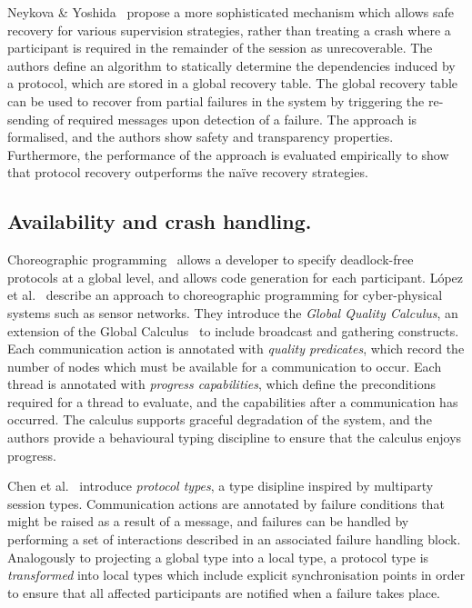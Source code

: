 \documentclass[
graybox,
envcountchap
]{svmult}
\begin{document}
\begin{bibunit}
  Neykova \& Yoshida~\cite{NeykovaY17:let-it-recover} propose a more
  sophisticated mechanism which allows safe recovery for various supervision
  strategies, rather than treating a crash where a participant is required in
  the remainder of the session as unrecoverable. The authors define an algorithm
  to statically determine the dependencies induced by a protocol, which are
  stored in a global recovery table. The global recovery table can be used to
  recover from partial failures in the system by triggering the re-sending of
  required messages upon detection of a failure. The approach is formalised, and
  the authors show safety and transparency properties. Furthermore, the
  performance of the approach is evaluated empirically to show that protocol
  recovery outperforms the na\"ive recovery strategies.

  \subsection{Availability and crash handling.}

  Choreographic programming~\cite{CarboneM13:df-design} allows a developer to
  specify deadlock-free protocols at a global level, and allows code generation
  for each participant. L\'opez et al.~\cite{LopezNN16:availability} describe an
  approach to choreographic programming for cyber-physical systems such as
  sensor networks. They introduce the \emph{Global Quality Calculus}, an
  extension of the Global Calculus~\cite{CarboneM13:df-design} to include
  broadcast and gathering constructs. Each communication action is annotated
  with \emph{quality predicates}, which record the number of nodes which must be
  available for a communication to occur. Each thread is annotated with
  \emph{progress capabilities}, which define the preconditions required for a
  thread to evaluate, and the capabilities after a communication has occurred.
  The calculus supports graceful degradation of the system, and the authors
  provide a behavioural typing discipline to ensure that the calculus enjoys
  progress.

  Chen et al.~\cite{ChenVBZE16:failure-handling} introduce \emph{protocol
  types}, a type disipline inspired by multiparty session types. Communication
  actions are annotated by failure conditions that might be raised as a result
  of a message, and failures can be handled by performing a set of interactions
  described in an associated failure handling block. Analogously to projecting a
  global type into a local type, a protocol type is \emph{transformed} into
  local types which include explicit synchronisation points in order to ensure
  that all affected participants are notified when a failure takes place.


\end{bibunit}
\end{document}
